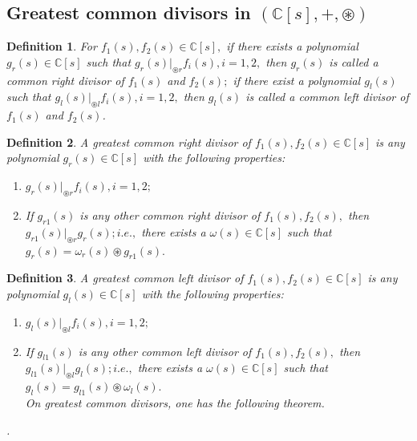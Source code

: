 \documentclass[12pt,a4paper,fleqn,twoside]{article}
\newtheorem{definition}{Definition}
\theoremstyle{plain}
\begin{document}
	\subsection{Greatest common divisors in $(\mathbb{C}[s],+,\circledast)$}
	\begin{definition}
		\normalfont
		For $f_1(s), f_2(s)\in \mathbb{C}[s],$ if there exists a polynomial $g_r(s)\in \mathbb{C}[s]$ such that $g_r(s)|_{\circledast r}f_i(s), i=1,2,$ then $g_r(s)$ is called a common right divisor of $f_1(s)$ and $f_2(s);$ if there exist a polynomial $g_l(s)$ such that $g_l(s)|_{\circledast l}f_i(s),i=1,2,$ then $g_l(s)$ is called a common left divisor of $f_1(s)$ and $f_2(s)$.
	\end{definition}
	\begin{definition}
		\normalfont
		A greatest common right divisor of $f_1(s),f_2(s)\in \mathbb{C}[s]$ is any polynomial $g_r(s)\in \mathbb{C}[s]$ with the following properties:
		\begin{enumerate}[(1)]
			\item $g_r(s)|_{\circledast r}f_i(s),i=1,2;$
			\item If $g_{r1}(s)$ is any other common right divisor of $f_1(s),f_2(s),$ then $g_{r1}(s)|_{\circledast r}g_r(s);i.e.,$ there exists a $\omega(s)\in \mathbb{C}[s]$ such that $g_r(s)=\omega_r(s)\circledast g_{r1}(s).$ 
		\end{enumerate}
	\end{definition}
	\begin{definition}
		\normalfont
		A greatest common left divisor of $f_1(s),f_2(s)\in \mathbb{C}[s]$ is any polynomial $g_l(s)\in \mathbb{C}[s]$ with the following properties:
		\begin{enumerate}[(1)]
			\item  $g_l(s)|_{\circledast l}f_i(s),i=1,2;$
			\item  If $g_{l1}(s)$ is any other common left divisor of $f_1(s),f_2(s),$ then $g_{l1}(s)|_{\circledast l}g_l(s);i.e.,$ there exists a $\omega(s)\in \mathbb{C}[s]$ such that $g_l(s)=g_{l1}(s)\circledast \omega_{l}(s).$\\[1em]
			On greatest common divisors, one has the following theorem.
		\end{enumerate}.
	\end{definition}
\end{document}
